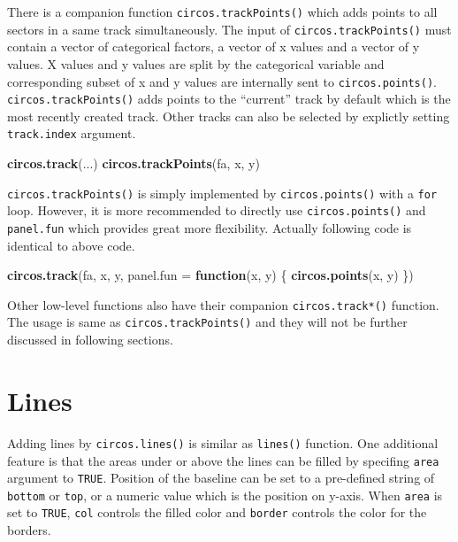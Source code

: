 \documentclass[]{book}
\newenvironment{Shaded}{\begin{snugshade}}{\end{snugshade}}
\newcommand{\KeywordTok}[1]{\textcolor[rgb]{0.13,0.29,0.53}{\textbf{#1}}}
\newcommand{\DataTypeTok}[1]{\textcolor[rgb]{0.13,0.29,0.53}{#1}}
\newcommand{\ControlFlowTok}[1]{\textcolor[rgb]{0.13,0.29,0.53}{\textbf{#1}}}
\newcommand{\NormalTok}[1]{#1}
\theoremstyle{definition}
\theoremstyle{definition}
\theoremstyle{remark}
\begin{document}
There is a companion function \texttt{circos.trackPoints()} which adds
points to all sectors in a same track simultaneously. The input of
\texttt{circos.trackPoints()} must contain a vector of categorical
factors, a vector of x values and a vector of y values. X values and y
values are split by the categorical variable and corresponding subset of
x and y values are internally sent to \texttt{circos.points()}.
\texttt{circos.trackPoints()} adds points to the ``current'' track by
default which is the most recently created track. Other tracks can also
be selected by explictly setting \texttt{track.index} argument.

\begin{Shaded}
\begin{Highlighting}[]
\KeywordTok{circos.track}\NormalTok{(...)}
\KeywordTok{circos.trackPoints}\NormalTok{(fa, x, y)}
\end{Highlighting}
\end{Shaded}

\texttt{circos.trackPoints()} is simply implemented by
\texttt{circos.points()} with a \texttt{for} loop. However, it is more
recommended to directly use \texttt{circos.points()} and
\texttt{panel.fun} which provides great more flexibility. Actually
following code is identical to above code.

\begin{Shaded}
\begin{Highlighting}[]
\KeywordTok{circos.track}\NormalTok{(fa, x, y, }\DataTypeTok{panel.fun =} \ControlFlowTok{function}\NormalTok{(x, y) \{}
    \KeywordTok{circos.points}\NormalTok{(x, y)}
\NormalTok{\})}
\end{Highlighting}
\end{Shaded}

Other low-level functions also have their companion
\texttt{circos.track*()} function. The usage is same as
\texttt{circos.trackPoints()} and they will not be further discussed in
following sections.

\section{Lines}\label{lines}

Adding lines by \texttt{circos.lines()} is similar as \texttt{lines()}
function. One additional feature is that the areas under or above the
lines can be filled by specifing \texttt{area} argument to
\texttt{TRUE}. Position of the baseline can be set to a pre-defined
string of \texttt{bottom} or \texttt{top}, or a numeric value which is
the position on y-axis. When \texttt{area} is set to \texttt{TRUE},
\texttt{col} controls the filled color and \texttt{border} controls the
color for the borders.
\end{document}
